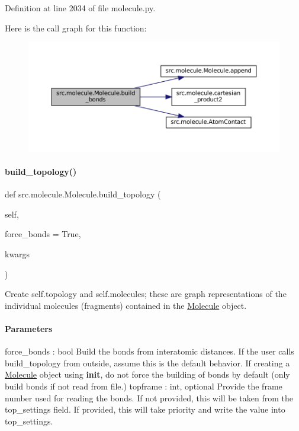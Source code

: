 Definition at line 2034 of file molecule.\+py.

Here is the call graph for this function\+:
\nopagebreak
\begin{figure}[H]
\begin{center}
\leavevmode
\includegraphics[width=350pt]{classsrc_1_1molecule_1_1Molecule_a55418dce14e7b54da5ccfa96b0c564d4_cgraph}
\end{center}
\end{figure}
\mbox{\label{classsrc_1_1molecule_1_1Molecule_afae2c34b572e137801c8077f4267b247}} 
\paragraph{\texorpdfstring{build\+\_\+topology()}{build\_topology()}}
{\footnotesize\ttfamily def src.\+molecule.\+Molecule.\+build\+\_\+topology (\begin{DoxyParamCaption}\item[{}]{self,  }\item[{}]{force\+\_\+bonds = {\ttfamily True},  }\item[{}]{kwargs }\end{DoxyParamCaption})}



Create self.\+topology and self.\+molecules; these are graph representations of the individual molecules (fragments) contained in the \hyperlink{classsrc_1_1molecule_1_1Molecule}{Molecule} object. 

\paragraph*{Parameters }

force\+\_\+bonds \+: bool Build the bonds from interatomic distances. If the user calls build\+\_\+topology from outside, assume this is the default behavior. If creating a \hyperlink{classsrc_1_1molecule_1_1Molecule}{Molecule} object using {\bfseries init}, do not force the building of bonds by default (only build bonds if not read from file.) topframe \+: int, optional Provide the frame number used for reading the bonds. If not provided, this will be taken from the top\+\_\+settings field. If provided, this will take priority and write the value into top\+\_\+settings. 

